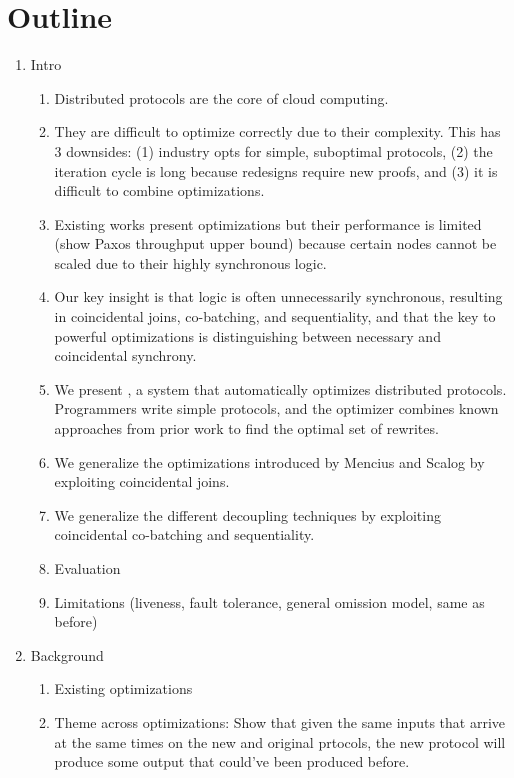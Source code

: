 \section{Outline}

\begin{enumerate}
  \item Intro
    \begin{enumerate}
      \item Distributed protocols are the core of cloud computing.
      \item They are difficult to optimize correctly due to their complexity.
        This has 3 downsides: (1) industry opts for simple, suboptimal protocols, (2) the iteration cycle is long because redesigns require new proofs, and (3) it is difficult to combine optimizations.
      \item Existing works present optimizations but their performance is limited (show Paxos throughput upper bound) because certain nodes cannot be scaled due to their highly synchronous logic.
      \item Our key insight is that logic is often unnecessarily synchronous, resulting in coincidental joins, co-batching, and sequentiality, and that the key to powerful optimizations is distinguishing between necessary and coincidental synchrony.
      \item We present \sys{}, a system that automatically optimizes distributed protocols. Programmers write simple protocols, and the optimizer combines known approaches from prior work to find the optimal set of rewrites.
      \item We generalize the optimizations introduced by Mencius and Scalog by exploiting coincidental joins.
      \item We generalize the different decoupling techniques by exploiting coincidental co-batching and sequentiality.
      \item Evaluation
      \item Limitations (liveness, fault tolerance, general omission model, same as before)
    \end{enumerate}
  \item Background
    \begin{enumerate}
      \item Existing optimizations
      \item Theme across optimizations: Show that given the same inputs that arrive at the same times on the new and original prtocols, the new protocol will produce some output that could've been produced before.

\end{enumerate}
\end{enumerate}
